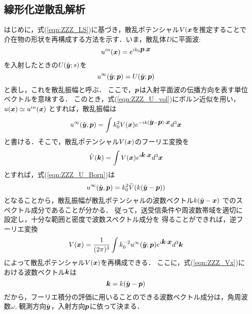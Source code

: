 \subsection{線形化逆散乱解析}
はじめに，式(\ref{eqn:ZZZ_LS})に基づき，散乱ポテンシャル$V(\mbox{\boldmath $x$}$を推定することで
介在物の形状を再構成する方法を示す．いま，散乱体$D$に平面波:
\begin{equation}
	u^{in}(\mbox{\boldmath $x$})= e^{ik_0\mbox{\boldmath $p$}\cdot\mbox{\boldmath $x$}}
	\label{eqn:ZZZ_17}
\end{equation}
を入射したときの$U(\hat{\mbox{\boldmath $y$}};s)$を
\begin{equation}
	u^{\infty}(\hat{\mbox{\boldmath $y$}};\mbox{\boldmath $p$})=U(\hat{\mbox{\boldmath $y$}};\mbox{\boldmath $p$})
	\label{eqn:ZZZ_18}
\end{equation}
と表し，これを散乱振幅と呼ぶ．
ここで，$\mbox{\boldmath $p$}$は入射平面波の伝播方向を表す単位ベクトルを意味する．
このとき，式(\ref{eqn:ZZZ_U_vol})にボルン近似を用い，$u(\mbox{\boldmath $x$})\simeq u^{in}(\mbox{\boldmath $x$})$
とすれば，散乱振幅は
\begin{equation}
	u^{\infty}(\hat{\mbox{\boldmath $y$}},\mbox{\boldmath $p$})
	=
	\int
	k_0^2 V(\mbox{\boldmath $x$}) e^{-ik(\hat{\mbox{\boldmath $y$}}-\mbox{\boldmath $p$} )\cdot \mbox{\boldmath $x$}}d^3\mbox{\boldmath $x$}
	\label{eqn:ZZZ_U_Born}
\end{equation}
と書ける．そこで，散乱ポテンシャル$V(\mbox{\boldmath $x$})$のフーリエ変換を
\begin{equation}
	\tilde V(\mbox{\boldmath $k$}) = \int V(\mbox{\boldmath $x$}) e^{i\mbox{\boldmath $k$}\cdot \mbox{\boldmath $x$}} d^3\mbox{\boldmath $x$}
	\label{eqn:ZZZ_Vk}
\end{equation}
とすれば，式(\ref{eqn:ZZZ_U_Born})は
\begin{equation}
	u^{\infty}(\hat{\mbox{\boldmath $y$}},\mbox{\boldmath $p$}) =k_0^2 \tilde V (
	k(\hat{\mbox{\boldmath $y$}}-\mbox{\boldmath $p$} )
	)
	\label{eqn:ZZZ_19}
\end{equation}
となることから，散乱振幅が散乱ポテンシャルの波数ベクトル$k(\hat{\mbox{\boldmath $y$}}-\mbox{\boldmath $x$})$
でのスペクトル成分であることが分かる．
従って，送受信条件や周波数帯域を適切に設定し，十分な範囲と密度で波数スペクトル成分を
得ることができれば，逆フーリエ変換
\begin{equation}
	V(\mbox{\boldmath $x$}) =\frac{1}{(2\pi)^3} \int k_0^{-2} u^{\infty}(\hat{\mbox{\boldmath $y$}};\mbox{\boldmath $p$}) 
	e^{i\mbox{\boldmath $k$}\cdot \mbox{\boldmath $x$}}d^3\mbox{\boldmath $k$}
	\label{eqn:ZZZ_Vx}
\end{equation}
によって散乱ポテンシャル$V(\mbox{\boldmath $x$})$を再構成できる．
ここに，式(\ref{eqn:ZZZ_Vx})における波数ベクトル$\mbox{\boldmath $k$}$は
\begin{equation}
	\mbox{\boldmath $k$}=k(\hat{\mbox{\boldmath $y$}}-\mbox{\boldmath $p$})
	\label{eqn:ZZZ_20}
\end{equation}
だから，フーリエ積分の評価に用いることのできる波数ベクトル成分は，角周波数$\omega$,
観測方向$\hat{\mbox{\boldmath $y$}}$，入射方向$\mbox{\boldmath $p$}$に依って決まる．

